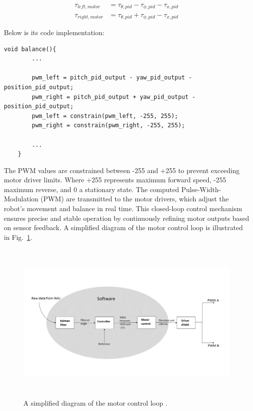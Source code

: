 \begin{align}
	\tau_{left,motor} &= \tau_{\theta,pid} - \tau_{\phi,pid} - \tau_{x,pid} \\
	\tau_{right,motor} &= \tau_{\theta,pid} + \tau_{\phi,pid} - \tau_{x,pid}
\end{align}

Below is its code implementation:
\begin{lstlisting}[style=cppstyle2]
	void balance(){
		...
		
		pwm_left = pitch_pid_output - yaw_pid_output - position_pid_output;
		pwm_right = pitch_pid_output + yaw_pid_output - position_pid_output;
		pwm_left = constrain(pwm_left, -255, 255);
		pwm_right = constrain(pwm_right, -255, 255);
		
		...
	}
\end{lstlisting}
The PWM values are constrained between -255 and +255 to prevent exceeding motor driver limits. Where +255 represents maximum forward speed, -255 maximum reverse, and 0 a stationary state. The computed Pulse-Width-Modulation (PWM) are transmitted to the motor drivers, which adjust the robot's movement and balance in real time. This closed-loop control mechanism ensures precise and stable operation by continuously refining motor outputs based on sensor feedback. A simplified diagram of the motor control loop is illustrated in Fig.~\ref{fig:schematics_control-loop}.

\begin{figure}[H]
	\centering
	\includegraphics[height=8cm]{assets/pitch_angle_control_loop.png}
	\caption{A simplified diagram of the motor control loop \cite{10193276}.}
	\label{fig:schematics_control-loop}
\end{figure}


